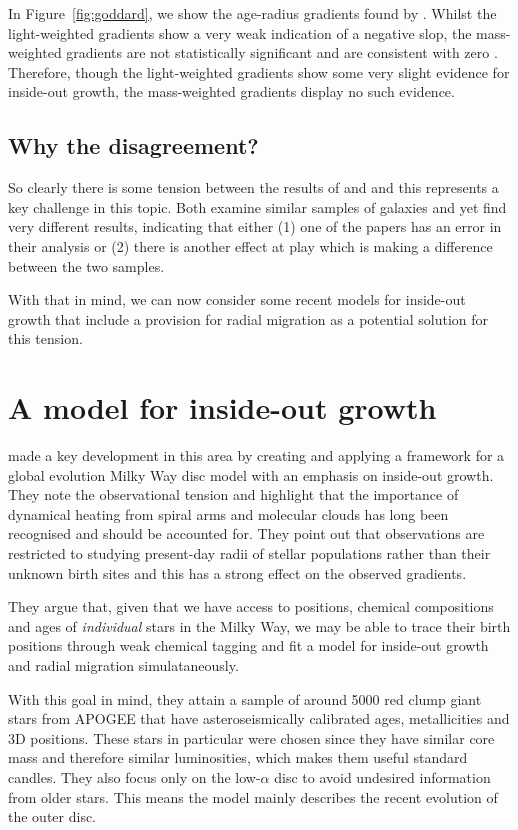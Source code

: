 \documentclass[preprint2]{aastex631}
\begin{document}
In Figure~\ref{fig:goddard}, we show the age-radius gradients found by \citet{Goddard+2017}. Whilst the light-weighted gradients show a very weak indication of a negative slop, the mass-weighted gradients are not statistically significant and are consistent with zero \citep[in agreement with][]{Sanchez-Blazquez+2014}. Therefore, though the light-weighted gradients show some very slight evidence for inside-out growth, the mass-weighted gradients display no such evidence.

\subsection{Why the disagreement?}
So clearly there is some tension between the results of \citet{vanDokkum+2013} and \citet{Goddard+2017} and this represents a key challenge in this topic. Both examine similar samples of galaxies and yet find very different results, indicating that either (1) one of the papers has an error in their analysis or (2) there is another effect at play which is making a difference between the two samples.

With that in mind, we can now consider some recent models for inside-out growth that include a provision for radial migration as a potential solution for this tension.

\section{A model for inside-out growth}
\citet{Frankel+2019} made a key development in this area by creating and applying a framework for a global evolution Milky Way disc model with an emphasis on inside-out growth. They note the observational tension and highlight that the importance of dynamical heating from spiral arms and molecular clouds has long been recognised and should be accounted for. They point out that observations are restricted to studying present-day radii of stellar populations rather than their unknown birth sites and this has a strong effect on the observed gradients.

They argue that, given that we have access to positions, chemical compositions and ages of \textit{individual} stars in the Milky Way, we may be able to trace their birth positions through weak chemical tagging and fit a model for inside-out growth and radial migration simulataneously.

With this goal in mind, they attain a sample of around 5000 red clump giant stars from APOGEE that have asteroseismically calibrated ages, metallicities and 3D positions. These stars in particular were chosen since they have similar core mass and therefore similar luminosities, which makes them useful standard candles. They also focus only on the low-$\alpha$ disc to avoid undesired information from older stars. This means the model mainly describes the recent evolution of the outer disc.
\end{document}
